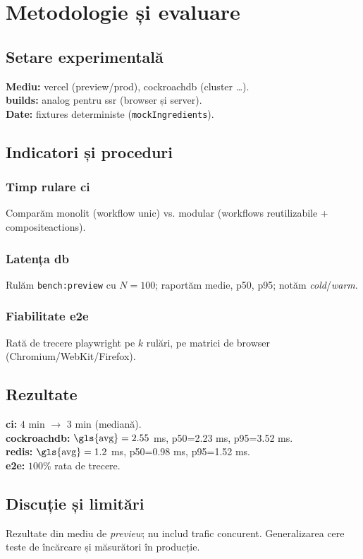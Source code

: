 \chapter{Metodologie și evaluare}\label{ch:evaluare}

\section{Setare experimentală}
\textbf{Mediu:} \gls{vercel} (preview/prod), \gls{cockroachdb} (cluster \dots).\\
\textbf{\Glspl{build}:} \gls{analog} pentru \acrfull{ssr} (browser și server).\\
\textbf{Date:} fixtures deterministe (\texttt{mockIngredients}).

\section{Indicatori și proceduri}

\subsection{Timp rulare \acrfull{ci}}
Comparăm monolit (\gls{workflow} unic) vs. modular (\glspl{workflow} reutilizabile + \glspl{compositeaction}).

\subsection{Latența \acrfull{db}}
Rulăm \texttt{bench:preview} cu \(N=100\); raportăm medie, \acrshort{p50}, \acrshort{p95}; notăm \textit{cold}/\textit{warm}.

\subsection{Fiabilitate \acrfull{e2e}}
Rată de trecere \gls{playwright} pe \(k\) rulări, pe matrici de browser (Chromium/WebKit/Firefox).

\section{Rezultate}
\textbf{\acrshort{ci}:} \(4\) min \(\rightarrow\) \(3\) min (mediană).\\
\textbf{\gls{cockroachdb}:} \(\text{\gls{avg}}=2.55\) ms, \acrshort{p50}=2.23 ms, \acrshort{p95}=3.52 ms.\\
\textbf{\gls{redis}:} \(\text{\gls{avg}}=1.2\) ms, \acrshort{p50}=0.98 ms, \acrshort{p95}=1.52 ms.\\
\textbf{\acrshort{e2e}:} \(100\)\% rata de trecere.
\section{Discuție și limitări}
Rezultate din mediu de \textit{preview}; nu includ trafic concurent. Generalizarea cere teste de încărcare și măsurători în producție.
